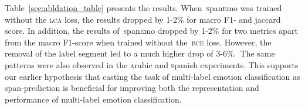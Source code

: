 \documentclass[11pt,a4paper]{article}
\begin{document}
Table~\ref{sec:abldation_table} presents the results. When~\textsc{s}pan\textsc{e}mo was trained without the \textsc{lca} loss, the results dropped by 1-2\% for macro F1- and jaccard score. In addition, the results of~\textsc{s}pan\textsc{e}mo dropped by 1-2\% for two metrics apart from the macro F1-score when trained without the~\textsc{bce} loss. However, the removal of the label segment led to a much higher drop of 3-6\%.~The same patterns were also observed in the \textsc{a}rabic and \textsc{s}panish experiments. This supports our earlier hypothesis that casting the task of multi-label emotion classification as span-prediction is beneficial for improving both the representation and performance of multi-label emotion classification.








\iffalse
\end{document}
